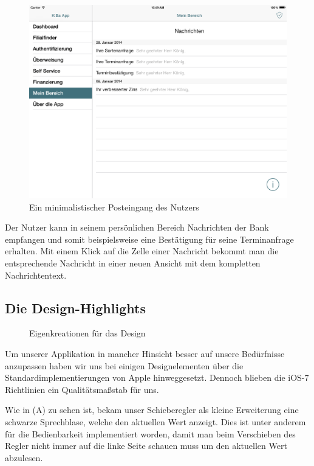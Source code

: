 \begin{figure}[h]
	\centering
  \includegraphics[scale=0.4]{Pictures/mbereichneu}
	\caption{Ein minimalistischer Posteingang des Nutzers}
	\label{fig10}
\end{figure}

	Der Nutzer kann in seinem persönlichen Bereich Nachrichten der Bank empfangen und somit beispielsweise eine Bestätigung für seine Terminanfrage erhalten. Mit einem Klick auf die Zelle einer Nachricht bekommt man die entsprechende Nachricht in einer neuen Ansicht mit dem kompletten Nachrichtentext.

\subsection{Die Design-Highlights}
\begin{figure}[h]
	\centering
	\caption{Eigenkreationen für das Design\label{fig11}}
\end{figure}

Um unserer Applikation in mancher Hinsicht besser auf unsere Bedürfnisse anzupassen haben wir uns bei einigen Designelementen über die Standardimplementierungen von Apple hinweggesetzt. Dennoch blieben die iOS-7 Richtlinien ein Qualitätsmaßstab für uns.

Wie in (A) zu sehen ist, bekam unser Schieberegler als kleine Erweiterung eine schwarze Sprechblase, welche den aktuellen Wert anzeigt. Dies ist unter anderem für die Bedienbarkeit implementiert worden, damit man beim Verschieben des Regler nicht immer auf die linke Seite schauen muss um den aktuellen Wert abzulesen.

